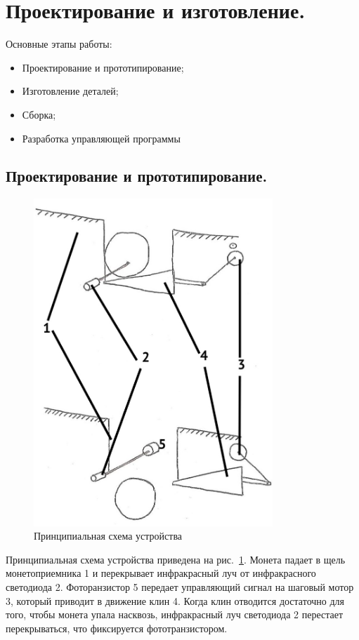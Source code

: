 \section {Проектирование и изготовление.}

Основные этапы работы:

\begin{itemize}
	\item Проектирование и прототипирование; 
	\item Изготовление деталей;
	\item Сборка;
	\item Разработка управляющей программы
\end{itemize}

\subsection{Проектирование и прототипирование.}

\begin{figure}[H]
	\centering
	\includegraphics[width=9cm]{pics/scheme_idea.jpg}
	\caption{Принципиальная схема устройства}
	\label{ris:scheme_idea}
\end{figure}
\par\medskip

Принципиальная схема устройства приведена на рис.~\ref{ris:scheme_idea}. Монета падает в щель монетоприемника 1 и перекрывает инфракрасный луч от инфракрасного светодиода 2. Фоторанзистор 5 передает управляющий сигнал на шаговый мотор 3, который приводит в движение клин 4. Когда клин отводится достаточно для того, чтобы монета упала насквозь, инфракрасный луч светодиода 2 перестает перекрываться, что фиксируется фототранзистором. 
\par\medskip


